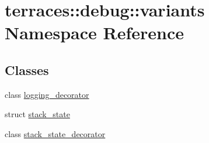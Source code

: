 \hypertarget{namespaceterraces_1_1debug_1_1variants}{}\section{terraces\+:\+:debug\+:\+:variants Namespace Reference}
\label{namespaceterraces_1_1debug_1_1variants}
\subsection*{Classes}
\begin{DoxyCompactItemize}
\item 
class \hyperlink{classterraces_1_1debug_1_1variants_1_1logging__decorator}{logging\+\_\+decorator}
\item 
struct \hyperlink{structterraces_1_1debug_1_1variants_1_1stack__state}{stack\+\_\+state}
\item 
class \hyperlink{classterraces_1_1debug_1_1variants_1_1stack__state__decorator}{stack\+\_\+state\+\_\+decorator}
\end{DoxyCompactItemize}
